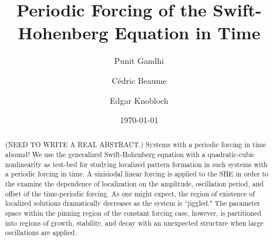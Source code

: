 \documentclass[aps,pre,longbibliography,12pt,a4paper,preprint]{revtex4-1}
\begin{document}


\title{Periodic Forcing of the Swift-Hohenberg Equation in Time}
\author{Punit Gandhi}
\author{C\'edric Beaume}
\author{Edgar Knobloch}
\date{\today}

\begin{abstract}
(NEED TO WRITE A REAL ABSTRACT.)
Systems with a periodic forcing in time abound!  We use the generalized Swift-Hohenberg equation with a quadratic-cubic nonlinearity as test-bed for studying localized pattern formation in such systems with a periodic forcing in time. A sinisiodal  linear forcing is applied to the SHE in order to the examine the dependence of localization on the amplitude, oscillation period, and offset of the time-periodic forcing.  As one might expect, the region of existence of localized solutions dramatically decreases as the system is ``jiggled."  The parameter space within the pinning region of the constant forcing case, however, is partitioned into regions of growth, stability, and decay with an unexpected structure when large oscillations are applied. 

\end{abstract}

\maketitle



















\end{document}
